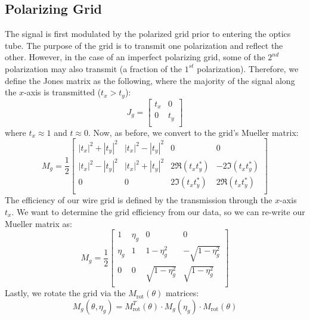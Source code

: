 \subsection{Polarizing Grid}
The signal is first modulated by the polarized grid prior to entering the optics tube.  The purpose of the grid is to transmit one polarization and reflect the other.  However, in the case of an imperfect polarizing grid, some of the $2^{nd}$ polarization may also transmit (a fraction of the $1^{st}$ polarization).  Therefore, we define the Jones matrix as the following, where the majority of the signal along the $x$-axis is transmitted ($t_x > t_y$):
\begin{equation}
    J_{g} = \begin{bmatrix}
    t_x & 0 \\
    0 & t_y\\
  \end{bmatrix}
\end{equation}
where $t_x\approx 1$ and $t\approx 0 $.  Now, as before, we convert to the grid's Mueller matrix:
\begin{equation}
    M_{g} =\frac{1}{2} \begin{bmatrix}
    |t_x|^2 + |t_y|^2 & |t_x|^2 - |t_y|^2 & 0& 0\\
    |t_x|^2 - |t_y|^2 & |t_x|^2 + |t_y|^2& 2\Re{(t_x t_y^*)}& -2\Im{(t_x t_y^*)}\\
    0 & 0& 2\Im{(t_x t_y^*)}& 2\Re{(t_x t_y^*)}\\
  \end{bmatrix}
\end{equation}
The efficiency of our wire grid is defined by the transmission through the $x$-axis $t_x$. We want to determine the grid efficiency from our data, so we can re-write our Mueller matrix as:
\begin{equation}
    M_{g} =\frac{1}{2} \begin{bmatrix}
    1 & \eta_g & 0& 0\\
    \eta_g & 1& 1-\eta_g^2 & -\sqrt{1-\eta_g^2}\\
    0 & 0& \sqrt{1-\eta_g^2}& \sqrt{1-\eta_g^2}\\
  \end{bmatrix}
\end{equation}
Lastly, we rotate the grid via the $M_{\text{rot}}(\theta)$ matrices:
\begin{equation}
    M_{g}(\theta,\eta_{g}) = M_{\text{rot}}^T(\theta) \cdot M_{g}(\eta_{g})\cdot M_{\text{rot}}(\theta)
\end{equation}
